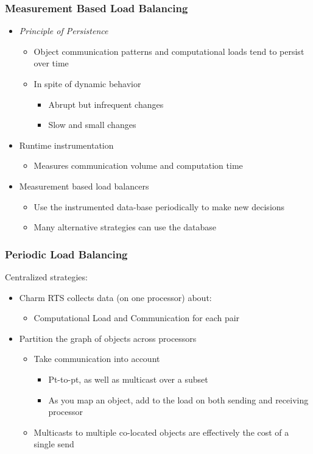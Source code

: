 \begin{frame}[fragile]
\frametitle{Measurement Based Load Balancing}
\begin{itemize}
 \item \emph{Principle of Persistence}
 \begin{itemize}
  \item Object communication patterns and computational loads tend to persist over time
  \item In spite of dynamic behavior
  \begin{itemize}
   \item Abrupt but infrequent changes
   \item Slow and small changes
  \end{itemize}
 \end{itemize}
\item Runtime instrumentation
\begin{itemize}
 \item Measures communication volume and computation time
\end{itemize}
\item Measurement based load balancers
\begin{itemize}
 \item Use the instrumented data-base periodically to make new decisions
 \item Many alternative strategies can use the database
\end{itemize}
\end{itemize}
\end{frame}

\begin{frame}[fragile]
\frametitle{Periodic Load Balancing}

Centralized strategies:
\begin{itemize}
 \item Charm RTS collects data (on one processor) about:
 \begin{itemize}
  \item Computational Load and Communication for each pair
 \end{itemize}
 \item Partition the graph of objects across processors
 \begin{itemize}
  \item Take communication into account
  \begin{itemize}
   \item Pt-to-pt, as well as multicast over a subset
   \item As you map an object, add to the load on both sending and receiving processor
  \end{itemize}
  \item Multicasts to multiple co-located objects are effectively the cost of a single send
 \end{itemize}
\end{itemize}
\end{frame}

